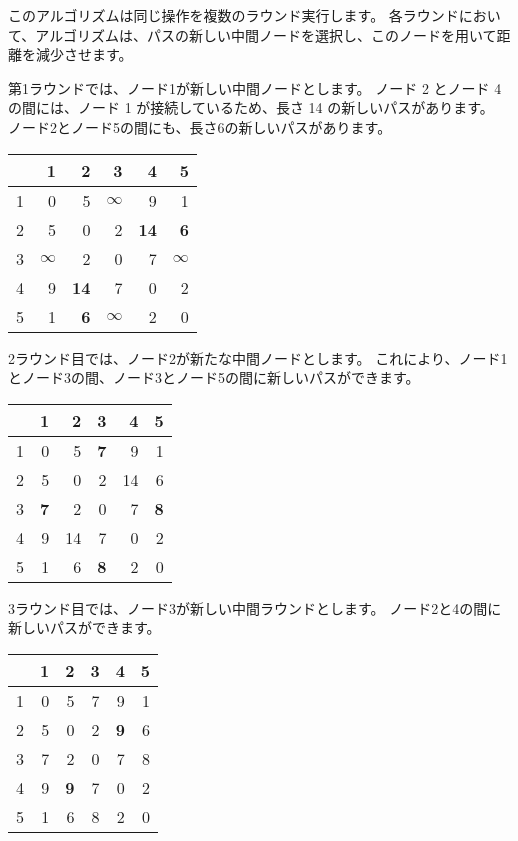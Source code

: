 このアルゴリズムは同じ操作を複数のラウンド実行します。
各ラウンドにおいて、アルゴリズムは、パスの新しい中間ノードを選択し、このノードを用いて距離を減少させます。

第1ラウンドでは、ノード1が新しい中間ノードとします。
ノード 2 とノード 4 の間には、ノード 1 が接続しているため、長さ 14 の新しいパスがあります。
ノード2とノード5の間にも、長さ6の新しいパスがあります。

\begin{center}
\begin{tabular}{r|rrrrr}
 & 1 & 2 & 3 & 4 & 5 \\
\hline
1 & 0 & 5 & $\infty$ & 9 & 1 \\
2 & 5 & 0 & 2 & \textbf{14} & \textbf{6} \\
3 & $\infty$ & 2 & 0 & 7 & $\infty$ \\
4 & 9 & \textbf{14} & 7 & 0 & 2 \\
5 & 1 & \textbf{6} & $\infty$ & 2 & 0 \\
\end{tabular}
\end{center}
\vspace{10pt}


2ラウンド目では、ノード2が新たな中間ノードとします。
これにより、ノード1とノード3の間、ノード3とノード5の間に新しいパスができます。

\begin{center}
\begin{tabular}{r|rrrrr}
 & 1 & 2 & 3 & 4 & 5 \\
\hline
1 & 0 & 5 & \textbf{7} & 9 & 1 \\
2 & 5 & 0 & 2 & 14 & 6 \\
3 & \textbf{7} & 2 & 0 & 7 & \textbf{8} \\
4 & 9 & 14 & 7 & 0 & 2 \\
5 & 1 & 6 & \textbf{8} & 2 & 0 \\
\end{tabular}
\end{center}
\vspace{10pt}


3ラウンド目では、ノード3が新しい中間ラウンドとします。
ノード2と4の間に新しいパスができます。

\begin{center}
\begin{tabular}{r|rrrrr}
 & 1 & 2 & 3 & 4 & 5 \\
\hline
1 & 0 & 5 & 7 & 9 & 1 \\
2 & 5 & 0 & 2 & \textbf{9} & 6 \\
3 & 7 & 2 & 0 & 7 & 8 \\
4 & 9 & \textbf{9} & 7 & 0 & 2 \\
5 & 1 & 6 & 8 & 2 & 0 \\
\end{tabular}
\end{center}
\vspace{10pt}



